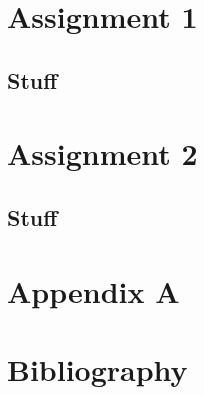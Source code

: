 \documentclass[11pt,a4paper]{report}
\begin{document}
\chapter{Assignment 1}
\section{Stuff}

\chapter{Assignment 2}
\section{Stuff}

\appendix
\chapter{Appendix A}
\chapter{Bibliography}

%
%
%
\end{document}
